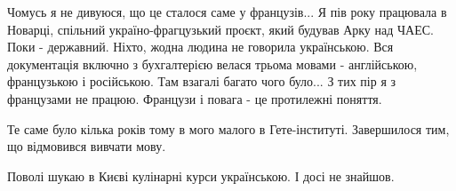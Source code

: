 \begin{itemize}

Чомусь я не дивуюся, що це сталося саме у французів... Я пів року працювала в
Новарці, спільний україно-фрагцузький проєкт, який будував Арку над ЧАЕС. Поки
- державний. Ніхто, жодна людина не говорила українською. Вся документація
включно з бухгалтерією велася трьома мовами - англійською, французькою і
російською. Там взагалі багато чого було... З тих пір я з французами не працюю.
Французи і повага - це протилежні поняття.

Те саме було кілька років тому в мого малого в Гете-інституті. Завершилося тим, що відмовився вивчати мову.

Поволі шукаю в Києві кулінарні курси українською. І досі не знайшов.

\end{itemize} %
